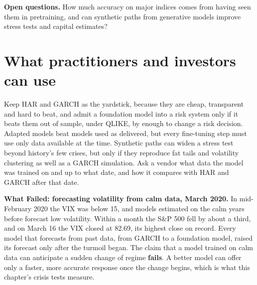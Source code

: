 \label{sec:23-open}
\textbf{Open questions.} How much accuracy on major indices comes from having seen them in pretraining, and can synthetic paths from generative models improve stress tests and capital estimates?

\section{What practitioners and investors can use}
\label{sec:23-investors}

Keep HAR and GARCH as the yardstick, because they are cheap, transparent and hard to beat, and admit a foundation model into a risk system only if it beats them out of sample, under QLIKE, by enough to change a risk decision. Adapted models beat models used as delivered, but every fine-tuning step must use only data available at the time. Synthetic paths can widen a stress test beyond history's few crises, but only if they reproduce fat tails and volatility clustering as well as a GARCH simulation. Ask a vendor what data the model was trained on and up to what date, and how it compares with HAR and GARCH after that date.

\begin{callout}
\textbf{What Failed: forecasting volatility from calm data, March 2020.} In mid-February 2020 the VIX was below 15, and models estimated on the calm years before forecast low volatility. Within a month the S\&P 500 fell by about a third, and on March 16 the VIX closed at 82.69, its highest close on record. Every model that forecasts from past data, from GARCH to a foundation model, raised its forecast only after the turmoil began. The claim that a model trained on calm data can anticipate a sudden change of regime \textbf{fails}. A better model can offer only a faster, more accurate response once the change begins, which is what this chapter's crisis tests measure.
\end{callout}

